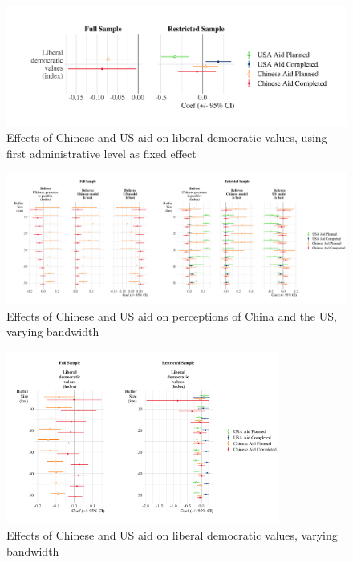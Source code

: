 \documentclass[9pt]{article}
\begin{document}
\begin{figure}[H]
\centering
\caption{Effects of Chinese and US aid on liberal democratic values, using first administrative level as fixed effect}
\includegraphics[width=1\textwidth]{figures/figure_a11.png} %
\end{figure}

\begin{figure}[H]
\centering
\caption{Effects of Chinese and US aid on perceptions of China and the US, varying bandwidth}
\includegraphics[width=1\textwidth]{figures/figure_a12.png} %
\end{figure}

\begin{figure}[H]
\centering
\caption{Effects of Chinese and US aid on liberal democratic values, varying bandwidth}
\includegraphics[width=0.8\textwidth]{figures/figure_a13.png} %
\end{figure}
\end{document}
